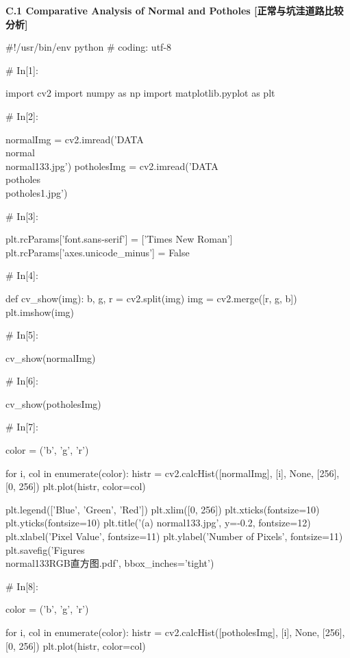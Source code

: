 \documentclass{MathorCupmodeling}
\begin{document}
\newpage

\textbf{C.1 Comparative Analysis of Normal and Potholes [正常与坑洼道路比较分析]}
\begin{python}
#!/usr/bin/env python
# coding: utf-8

# In[1]:


import cv2
import numpy as np
import matplotlib.pyplot as plt

# In[2]:


normalImg = cv2.imread('DATA\\normal\\normal133.jpg')
potholesImg = cv2.imread('DATA\\potholes\\potholes1.jpg')

# In[3]:


plt.rcParams['font.sans-serif'] = ['Times New Roman']
plt.rcParams['axes.unicode_minus'] = False


# In[4]:


def cv_show(img):
    b, g, r = cv2.split(img)
    img = cv2.merge([r, g, b])
    plt.imshow(img)


# In[5]:


cv_show(normalImg)

# In[6]:


cv_show(potholesImg)

# In[7]:


color = ('b', 'g', 'r')

for i, col in enumerate(color):
    histr = cv2.calcHist([normalImg], [i], None, [256], [0, 256])
    plt.plot(histr, color=col)

plt.legend(['Blue', 'Green', 'Red'])
plt.xlim([0, 256])
plt.xticks(fontsize=10)
plt.yticks(fontsize=10)
plt.title('(a) normal133.jpg', y=-0.2, fontsize=12)
plt.xlabel('Pixel Value', fontsize=11)
plt.ylabel('Number of Pixels', fontsize=11)
plt.savefig('Figures\\normal133RGB直方图.pdf', bbox_inches='tight')

# In[8]:


color = ('b', 'g', 'r')

for i, col in enumerate(color):
    histr = cv2.calcHist([potholesImg], [i], None, [256], [0, 256])
    plt.plot(histr, color=col)


\end{python}
\end{document}
